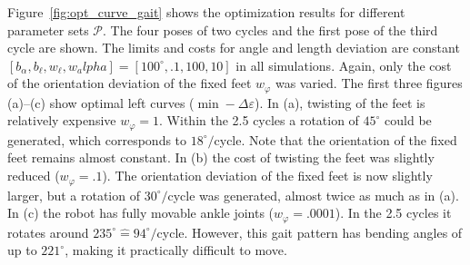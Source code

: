 \documentclass[letterpaper,10pt,conference]{ieeeconf}  %
\begin{document}

Figure~\ref{fig:opt_curve_gait} shows the optimization results for different parameter sets $\mathcal{P}$.
The four poses of two cycles and the first pose of the third cycle are shown.
The limits and costs for angle and length deviation are constant $[b_\alpha, b_\ell, w_\ell, w_alpha] =[100^\circ, .1, 100, 10]$ in all simulations.
Again, only the cost of the orientation deviation of the fixed feet $w_\varphi$ was varied.
The first three figures (a)--(c) show optimal left curves ($\min -\Delta \varepsilon$).
In (a), twisting of the feet is relatively expensive $w_\varphi=1$.
Within the 2.5 cycles a rotation of $45^\circ$ could be generated, which corresponds to $18^\circ/$cycle.
Note that the orientation of the fixed feet remains almost constant.
In (b) the cost of twisting the feet was slightly reduced ($w_\varphi=.1$).
The orientation deviation of the fixed feet is now slightly larger, but a rotation of $30^\circ/$cycle was generated, almost twice as much as in (a).
In (c) the robot has fully movable ankle joints ($w_\varphi=.0001$).
In the 2.5 cycles it rotates around $235^\circ \hat{=} 94^\circ/$cycle.
However, this gait pattern has bending angles of up to $221^\circ$, making it practically difficult to move.
\end{document}
